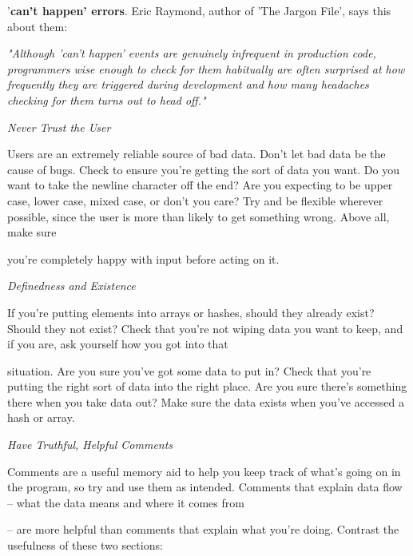 \documentclass[a4paper,11pt]{book}
\begin{document}
\noindent '\textbf{can't happen' errors}. Eric Raymond, author of 'The Jargon File', says this about them:

\noindent 

\noindent 

\noindent \textit{"Although 'can't happen' events are genuinely infrequent in production code, programmers wise enough to check for them habitually are often surprised at how frequently they are triggered during development and how many headaches checking for them turns out to head off."}

\noindent 

\noindent \textit{Never Trust the User}

\noindent Users are an extremely reliable source of bad data. Don't let bad data be the cause of bugs. Check to ensure you're getting the sort of data you want. Do you want to take the newline character off the end? Are you expecting to be upper case, lower case, mixed case, or don't you care? Try and be flexible wherever possible, since the user is more than likely to get something wrong. Above all, make sure

\noindent you're completely happy with input before acting on it.

\noindent 

\noindent \textit{Definedness and Existence}

\noindent If you're putting elements into arrays or hashes, should they already exist? Should they not exist? Check that you're not wiping data you want to keep, and if you are, ask yourself how you got into that

\noindent situation. Are you sure you've got some data to put in? Check that you're putting the right sort of data into the right place. Are you sure there's something there when you take data out? Make sure the data exists when you've accessed a hash or array.

\noindent 

\noindent 

\noindent \textit{Have Truthful, Helpful Comments}

\noindent Comments are a useful memory aid to help you keep track of what's going on in the program, so try and use them as intended. Comments that explain data flow -- what the data means and where it comes from

\noindent -- are more helpful than comments that explain what you're doing. Contrast the usefulness of these two sections:

\noindent 
\end{document}
